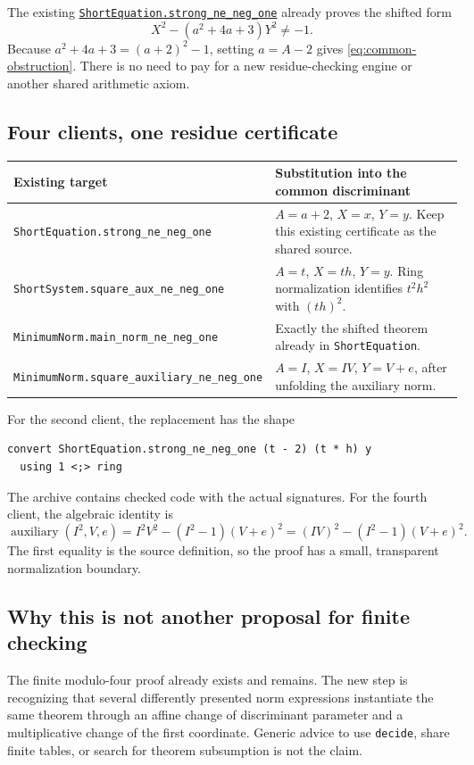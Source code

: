 \documentclass[11pt,letterpaper]{article}
\newcommand{\code}[1]{\nolinkurl{#1}}
\newcommand{\src}[2]{\href{https://github.com/VladimirReshetnikov/ProveIt/blob/9bd29079d5e1c6cc1c0bcaee6cb57d59b835cba9/Computability/DiophantineConsistency/Lean/DiophantineConsistency/#1.lean}{\code{#1.#2}}}
\begin{document}
The existing \src{ShortEquation}{strong_ne_neg_one} already proves the shifted form
\[
 X^2-(a^2+4a+3)Y^2\ne-1.
\]
Because $a^2+4a+3=(a+2)^2-1$, setting $a=A-2$ gives \eqref{eq:common-obstruction}. There is no need to pay for a new residue-checking engine or another shared arithmetic axiom.

\subsection{Four clients, one residue certificate}

\begin{longtable}{P{0.38\textwidth}P{0.48\textwidth}}
\toprule
Existing target & Substitution into the common discriminant\\
\midrule\endhead
\code{ShortEquation.strong_ne_neg_one} & $A=a+2$, $X=x$, $Y=y$. Keep this existing certificate as the shared source.\\
\code{ShortSystem.square_aux_ne_neg_one} & $A=t$, $X=th$, $Y=y$. Ring normalization identifies $t^2h^2$ with $(th)^2$.\\
\code{MinimumNorm.main_norm_ne_neg_one} & Exactly the shifted theorem already in \code{ShortEquation}.\\
\code{MinimumNorm.square_auxiliary_ne_neg_one} & $A=I$, $X=IV$, $Y=V+e$, after unfolding the auxiliary norm.\\
\bottomrule
\end{longtable}

For the second client, the replacement has the shape
\begin{lstlisting}
convert ShortEquation.strong_ne_neg_one (t - 2) (t * h) y
  using 1 <;> ring
\end{lstlisting}
The archive contains checked code with the actual signatures. For the fourth client, the algebraic identity is
\[
 \operatorname{auxiliary}(I^2,V,e)
 =I^2V^2-(I^2-1)(V+e)^2
 =(IV)^2-(I^2-1)(V+e)^2.
\]
The first equality is the source definition, so the proof has a small, transparent normalization boundary.

\subsection{Why this is not another proposal for finite checking}

The finite modulo-four proof already exists and remains. The new step is recognizing that several differently presented norm expressions instantiate the same theorem through an affine change of discriminant parameter and a multiplicative change of the first coordinate. Generic advice to use \code{decide}, share finite tables, or search for theorem subsumption is not the claim.
\end{document}
